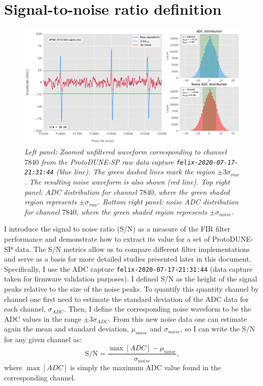 \section{Signal-to-noise ratio definition}
\label{sec:A.1}

\begin{figure}[t]
	\centering
	\includegraphics[width=1\linewidth]{Images/Matched_Filter/waveform_example_raw}
	\caption{\textit{Left panel: Zoomed unfiltered waveform corresponding to channel $7840$ from the ProtoDUNE-SP raw data capture \texttt{felix-2020-07-17-21:31:44} (blue line). The green dashed lines mark the region $\pm3\sigma_{raw}$. The resulting noise waveform is also shown (red line). Top right panel: ADC distribution for channel $7840$, where the green shaded region represents $\pm \sigma_{raw}$. Bottom right panel: noise ADC distribution for channel $7840$, where the green shaded region represents $\pm \sigma_{noise}$.}}
	\label{fig:adcs_nofir}
\end{figure}

I introduce the signal to noise ratio (S/N) as a measure of the FIR filter performance and demonstrate how to extract its value for a set of 
ProtoDUNE-SP data. The S/N metrics allow us to compare different filter implementations and serve as a basis for more detailed studies presented later in this document. Specifically, I use the ADC capture \texttt{felix-2020-07-17-21:31:44} (data capture taken for firmware validation purposes). I defined S/N as the height of the signal peaks relative to the size of the noise peaks. To quantify this quantity channel by channel one first need to estimate the standard deviation of the ADC data for each channel, $\sigma_{ADC}$. Then, I define the corresponding noise waveform to be the ADC values in the range $\pm 3 \sigma_{ADC}$. From this new noise data one can estimate again the mean and standard deviation, $\mu_{noise}$ and $\sigma_{noise}$, so I can write the S/N for any given channel as:
\begin{equation}
	\mathrm{S/N} = \frac{\max{[ADC]} - \mu_{noise}}{\sigma_{noise}},
\end{equation}
where $\max{[ADC]}$ is simply the maximum ADC value found in the corresponding channel.

